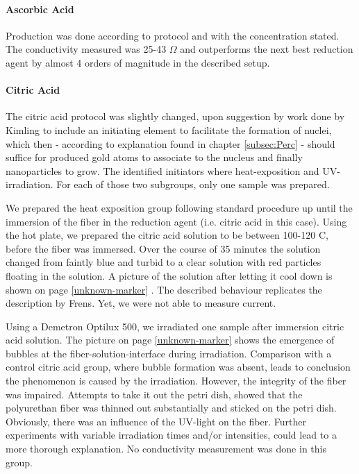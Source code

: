 \paragraph{Ascorbic Acid}
Production was done according to protocol and with the concentration stated. The conductivity measured was 25-43 $\Omega$ and outperforms the next best reduction agent by almost 4 orders of magnitude in the described setup. 


\paragraph{Citric Acid}
The citric acid protocol was slightly changed, upon suggestion by work done by Kimling \cite{Kimling} to include an initiating element to facilitate the formation of nuclei, which then - according to explanation found in chapter \ref{subsec:Perc} - should suffice for produced gold atoms to associate to the nucleus and finally nanoparticles to grow. The identified initiators where heat-exposition and UV-irradiation. For each of those two subgroups, only one sample was prepared.

We prepared the heat exposition group following standard procedure up until the immersion of the fiber in the reduction agent (i.e. citric acid in this case). Using the hot plate, we prepared the citric acid solution to be between 100-120 \degree C, before the fiber was immersed. Over the course of 35 minutes the solution changed from faintly blue and turbid to a clear solution with red particles floating in the solution. A picture of the solution after letting it cool down is shown on page \ref{unknown-marker} . The described behaviour replicates the description by Frens\cite{Frens}. Yet, we were not able to measure current.

Using a Demetron Optilux 500, we irradiated one sample after immersion  citric acid solution. The picture on page \ref{unknown-marker}  shows the emergence of bubbles at the fiber-solution-interface during irradiation. Comparison with a control citric acid group, where bubble formation was absent, leads to conclusion the phenomenon is caused by the irradiation. However, the integrity of the fiber was impaired. Attempts to take it out the petri dish, showed that the polyurethan fiber was thinned out substantially and sticked on the petri dish. Obviously, there was an influence of the UV-light on the fiber. Further experiments with variable irradiation times and/or intensities, could lead to a more thorough explanation. No conductivity measurement was done in this group.


